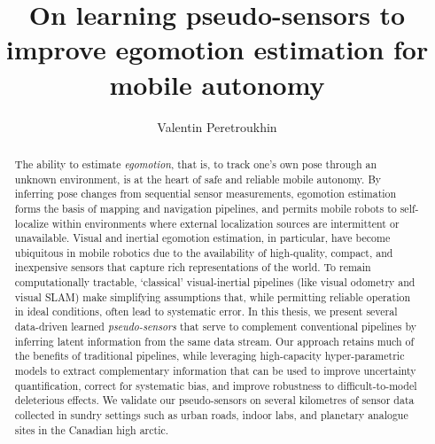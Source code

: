 \documentclass[oneandahalfspaced,twoside,12pt]{ut-thesis}
\author{Valentin Peretroukhin}
\title{On learning pseudo-sensors to improve egomotion estimation for mobile autonomy}
\begin{document}
\begin{preliminary}

\maketitle


\begin{abstract}
The ability to estimate \textit{egomotion}, that is, to track one's own pose through an unknown environment, is at the heart of safe and reliable mobile autonomy. By inferring pose changes from sequential sensor measurements, egomotion estimation forms the basis of mapping and navigation pipelines, and permits mobile robots to self-localize within environments where external localization sources are intermittent or unavailable. 
Visual and inertial egomotion estimation, in particular, have become ubiquitous in mobile robotics due to the availability of high-quality, compact, and inexpensive sensors that capture rich representations of the world.
 To remain computationally tractable, `classical' visual-inertial pipelines (like visual odometry and visual SLAM) make simplifying assumptions that, while permitting reliable operation in ideal conditions, often lead to systematic error. In this thesis, we present several data-driven learned \textit{pseudo-sensors} that serve to complement conventional pipelines by inferring latent information from the same data stream. Our approach retains much of the benefits of traditional pipelines, while leveraging high-capacity hyper-parametric models to extract complementary information that can be used to improve uncertainty quantification, correct for systematic bias, and improve robustness to difficult-to-model deleterious effects.
We validate our pseudo-sensors on several kilometres of sensor data collected in sundry settings such as urban roads, indoor labs, and planetary analogue sites in the Canadian high arctic.
\end{abstract}


\end{preliminary}
\end{document}
